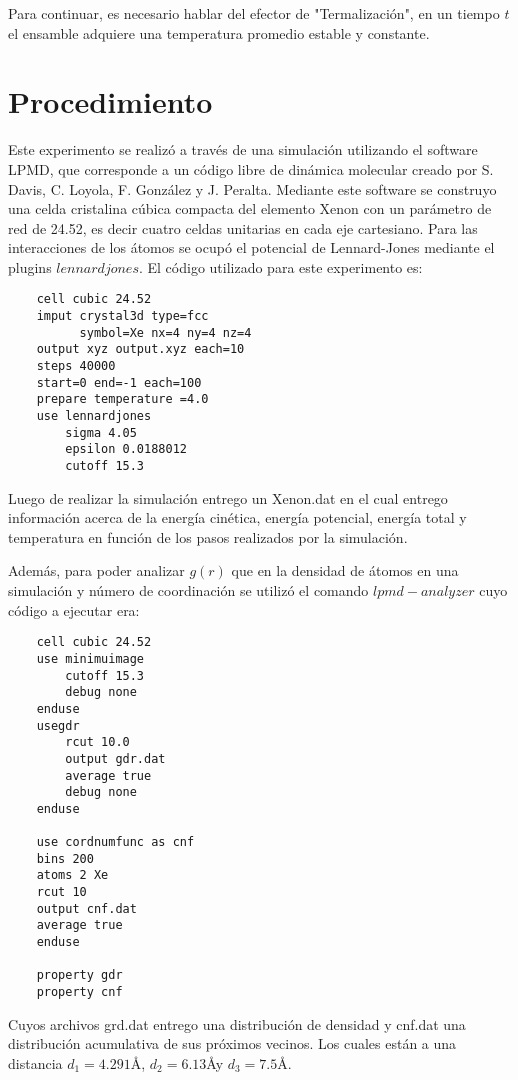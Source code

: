 \documentclass[10pt,letterpaper,twocolumn]{article}
\begin{document}
Para continuar, es necesario hablar del efector de "Termalización", en un tiempo $t$ el ensamble 
adquiere una temperatura promedio estable y constante.

\section*{Procedimiento}

Este experimento se  realizó a través de una simulación utilizando el software LPMD, 
que corresponde a un código libre de dinámica molecular creado por S. Davis, C. Loyola, F. González 
y J. Peralta. Mediante este software se construyo una celda cristalina cúbica compacta del elemento 
Xenon con un parámetro de red de 24.52, es decir cuatro celdas unitarias en cada eje cartesiano. 
Para las interacciones de los átomos se ocupó el potencial de Lennard-Jones mediante el 
plugins $lennardjones$.
El código utilizado para este experimento es:

\begin{lstlisting}
    cell cubic 24.52
    imput crystal3d type=fcc 
          symbol=Xe nx=4 ny=4 nz=4
    output xyz output.xyz each=10
    steps 40000
    start=0 end=-1 each=100 
    prepare temperature =4.0
    use lennardjones
        sigma 4.05
        epsilon 0.0188012
        cutoff 15.3
\end{lstlisting}

Luego de realizar la simulación entrego un Xenon.dat en el cual entrego información 
acerca de la energía cinética, energía potencial, energía total y temperatura en
 función de los pasos realizados por la simulación. 

Además, para poder analizar $g(r)$ que en la densidad de átomos en una simulación y número de 
coordinación se utilizó el comando $lpmd-analyzer$ cuyo código a ejecutar era:

\begin{lstlisting}
    cell cubic 24.52
    use minimuimage
        cutoff 15.3
        debug none
    enduse
    usegdr
        rcut 10.0
        output gdr.dat
        average true
        debug none
    enduse
    
    use cordnumfunc as cnf
    bins 200
    atoms 2 Xe
    rcut 10
    output cnf.dat
    average true
    enduse

    property gdr
    property cnf
\end{lstlisting}
 
Cuyos archivos grd.dat entrego una distribución de densidad y cnf.dat una distribución 
acumulativa de sus próximos vecinos. Los cuales están a una 
distancia $d_{1}=4.291$\AA , $d_{2}=6.13$\AA y $d_{3}=7.5$\AA.
\end{document}
